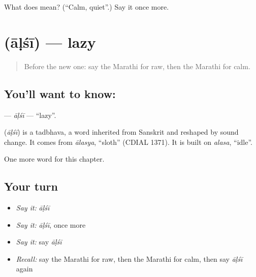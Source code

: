 \begin{tcolorbox}[breakable,colback=teal!4,colframe=teal!35!black,title={Before you move on}]
What does  mean? (\textquotedblleft{}Calm, quiet\textquotedblright{}.) Say it once more.
\end{tcolorbox}
\section[\texorpdfstring{\mr{आळशी} (āḷśī)}{आळशी (āḷśī)}]{ (āḷśī) — lazy}

\label{lesson:MR-C150-alsi}



\begin{quote}
Before the new one: say the Marathi for raw, then the Marathi for calm.
\end{quote}

\subsection*{You'll want to know: }
\textbf{} — \emph{āḷśī} — \textquotedblleft{}lazy\textquotedblright{}.

\begin{cousinweb}
\textbf{} (\emph{āḷśī}) is a tadbhava, a word inherited from Sanskrit and reshaped by sound change. It comes from \emph{ālasya}, \textquotedblleft{}sloth\textquotedblright{} (CDIAL 1371). It is built on \emph{alasa}, \textquotedblleft{}idle\textquotedblright{}.
\end{cousinweb}

\begin{grammarlens}[title={What you've built}]
One more word for this chapter.
\end{grammarlens}

\subsection*{Your turn}
\begin{itemize}
\raggedright
  \item \emph{Say it:} \emph{āḷśī}
  \item \emph{Say it:} \emph{āḷśī}, once more
  \item \emph{Say it:} say \emph{āḷśī}
  \item \emph{Recall:} say the Marathi for raw, then the Marathi for calm, then say \emph{āḷśī} again
\end{itemize}

